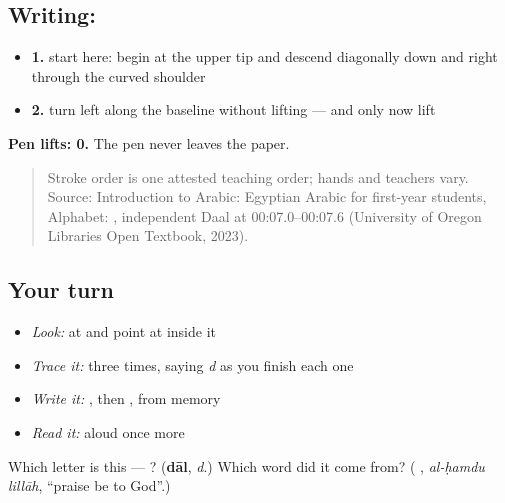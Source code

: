 \subsection*{Writing: }

\begin{itemize}
\raggedright
  \item \textbf{1.} start here: begin at the upper tip and descend diagonally down and right through the curved shoulder
  \item \textbf{2.} turn left along the baseline without lifting — and only now lift
\end{itemize}

\textbf{Pen lifts: 0.} The pen never leaves the paper.

\begin{quote}
Stroke order is one attested teaching order; hands and teachers vary. Source: Introduction to Arabic: Egyptian Arabic for first-year students, Alphabet:   , independent Daal at 00:07.0–00:07.6 (University of Oregon Libraries Open Textbook, 2023).
\end{quote}

\subsection*{Your turn}
\begin{itemize}
\raggedright
  \item \emph{Look:} at \textbf{ } and point at  inside it
  \item \emph{Trace it:}  three times, saying \emph{d} as you finish each one
  \item \emph{Write it:} , then , from memory
  \item \emph{Read it:} \textbf{ } aloud once more
\end{itemize}

\begin{tcolorbox}[breakable,colback=teal!4,colframe=teal!35!black,title={Before you move on}]
Which letter is this — ? (\textbf{dāl}, \emph{d}.) Which word did it come from? (\textbf{ }, \emph{al-ḥamdu lillāh}, \textquotedblleft{}praise be to God\textquotedblright{}.)
\end{tcolorbox}
